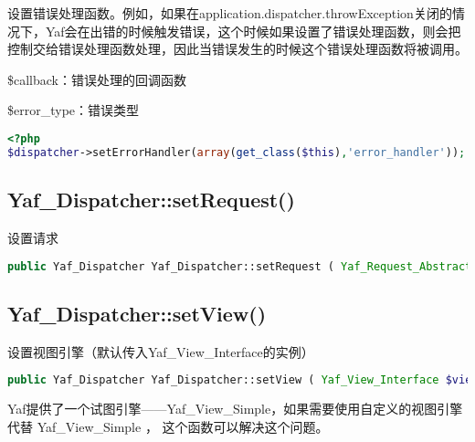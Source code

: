 设置错误处理函数。例如，如果在application.dispatcher.throwException关闭的情况下，Yaf会在出错的时候触发错误，这个时候如果设置了错误处理函数，则会把控制交给错误处理函数处理，因此当错误发生的时候这个错误处理函数将被调用。

\begin{compactitem}
\item \$callback：错误处理的回调函数
\item \$error\_type：错误类型
\end{compactitem}



\begin{lstlisting}[language=PHP]
<?php
$dispatcher->setErrorHandler(array(get_class($this),'error_handler'));
\end{lstlisting}


\subsection{Yaf\_Dispatcher::setRequest()}

设置请求

\begin{lstlisting}[language=PHP]
public Yaf_Dispatcher Yaf_Dispatcher::setRequest ( Yaf_Request_Abstract $request )
\end{lstlisting}


\subsection{Yaf\_Dispatcher::setView()}

设置视图引擎（默认传入Yaf\_View\_Interface的实例）

\begin{lstlisting}[language=PHP]
public Yaf_Dispatcher Yaf_Dispatcher::setView ( Yaf_View_Interface $view )
\end{lstlisting}

Yaf提供了一个试图引擎——Yaf\_View\_Simple，如果需要使用自定义的视图引擎代替 Yaf\_View\_Simple ， 这个函数可以解决这个问题。


